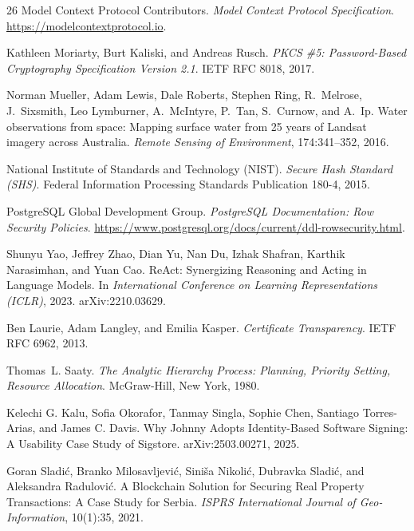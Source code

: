 \documentclass[10pt,a4paper,twocolumn]{article}
\begin{document}
\begin{thebibliography}{26}
Model Context Protocol Contributors.
\newblock \emph{Model Context Protocol Specification}.
\newblock \url{https://modelcontextprotocol.io}.

Kathleen Moriarty, Burt Kaliski, and Andreas Rusch.
\newblock \emph{PKCS \#5: Password-Based Cryptography Specification Version 2.1}.
\newblock IETF RFC 8018, 2017.

Norman Mueller, Adam Lewis, Dale Roberts, Stephen Ring, R.~Melrose, J.~Sixsmith,
  Leo Lymburner, A.~McIntyre, P.~Tan, S.~Curnow, and A.~Ip.
\newblock Water observations from space: Mapping surface water from 25 years of Landsat imagery across Australia.
\newblock \emph{Remote Sensing of Environment}, 174:341--352, 2016.

National Institute of Standards and Technology (NIST).
\newblock \emph{Secure Hash Standard (SHS)}.
\newblock Federal Information Processing Standards Publication 180-4, 2015.

PostgreSQL Global Development Group.
\newblock \emph{PostgreSQL Documentation: Row Security Policies}.
\newblock \url{https://www.postgresql.org/docs/current/ddl-rowsecurity.html}.

Shunyu Yao, Jeffrey Zhao, Dian Yu, Nan Du, Izhak Shafran, Karthik Narasimhan,
  and Yuan Cao.
\newblock ReAct: Synergizing Reasoning and Acting in Language Models.
\newblock In \emph{International Conference on Learning Representations (ICLR)}, 2023.
\newblock arXiv:2210.03629.

Ben Laurie, Adam Langley, and Emilia Kasper.
\newblock \emph{Certificate Transparency}.
\newblock IETF RFC 6962, 2013.

Thomas~L. Saaty.
\newblock \emph{The Analytic Hierarchy Process: Planning, Priority Setting, Resource Allocation}.
\newblock McGraw-Hill, New York, 1980.

Kelechi G. Kalu, Sofia Okorafor, Tanmay Singla, Sophie Chen,
  Santiago Torres-Arias, and James C. Davis.
\newblock Why Johnny Adopts Identity-Based Software Signing: A Usability Case Study of
  Sigstore.
\newblock arXiv:2503.00271, 2025.

Goran Sladi\'c, Branko Milosavljevi\'c, Sini\v{s}a Nikoli\'c, Dubravka Sladi\'c,
  and Aleksandra Radulovi\'c.
\newblock A Blockchain Solution for Securing Real Property Transactions: A Case Study for
  Serbia.
\newblock \emph{ISPRS International Journal of Geo-Information}, 10(1):35, 2021.


\end{thebibliography}
\end{document}
